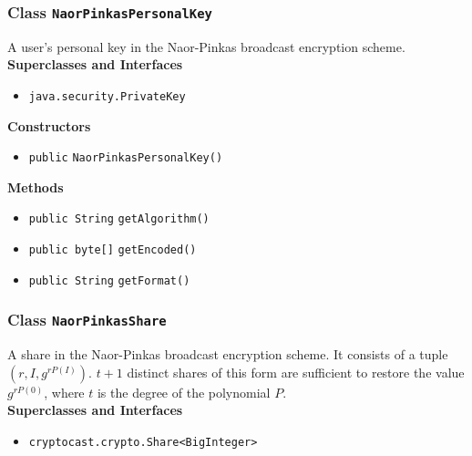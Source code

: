 \subsubsection{Class \lstinline|NaorPinkasPersonalKey|}
A user's personal key in the Naor-Pinkas broadcast encryption scheme. \\


\textbf{Superclasses and Interfaces}
\begin{itemize}
\item \lstinline|java.security.PrivateKey|
\end{itemize}



\textbf{Constructors}
\begin{itemize}
\item \lstinline|public| \lstinline|NaorPinkasPersonalKey|\lstinline|()|




\end{itemize}


\textbf{Methods}
\begin{itemize}
\item \lstinline|public String| \lstinline|getAlgorithm|\lstinline|()|




\item \lstinline|public byte[]| \lstinline|getEncoded|\lstinline|()|




\item \lstinline|public String| \lstinline|getFormat|\lstinline|()|




\end{itemize}

\subsubsection{Class \lstinline|NaorPinkasShare|}
A share in the Naor-Pinkas broadcast encryption scheme. It consists of a tuple
 $(r, I, g^{r P(I)})$. $t + 1$ distinct shares of this form are sufficient to restore the
 value $g^{r P(0)}$, where $t$ is the degree of the polynomial $P$. \\


\textbf{Superclasses and Interfaces}
\begin{itemize}
\item \lstinline|cryptocast.crypto.Share<BigInteger>|
\end{itemize}




